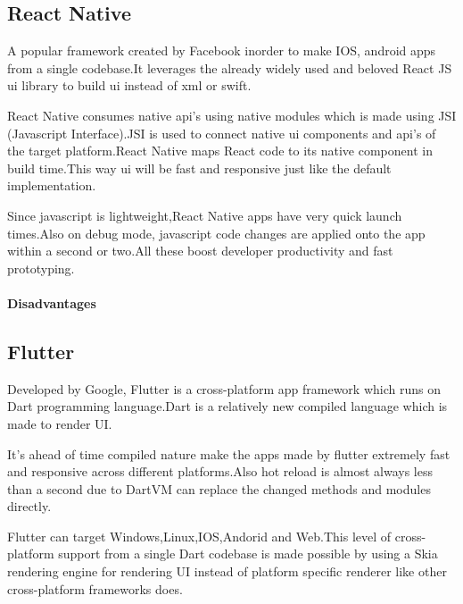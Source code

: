 \documentclass[14pt]{extarticle}
\begin{document}
\subsection{React Native}
\parbox{\linewidth}{
    A popular framework created by Facebook inorder to make IOS, android apps from a single codebase.It leverages the already widely used and beloved React JS ui library to build ui instead of xml or swift.

    React Native consumes native api's using native modules which is made using JSI (Javascript Interface).JSI is used to connect native ui components and api's of the target platform.React Native maps React code to its native component in build time.This way ui will be fast and responsive just like the default implementation.

    Since javascript is lightweight,React Native apps have very quick launch times.Also on debug mode, javascript code changes are applied onto the app
    within a second or two.All these boost developer productivity and fast prototyping.
}

\paragraph{Disadvantages}

\newpage
\subsection{Flutter}
\parbox{\linewidth}{
    Developed by Google, Flutter is a cross-platform app framework which runs on Dart programming language.Dart is a relatively new compiled language which is made to render UI.

    It's ahead of time compiled nature make the apps made by flutter extremely fast and responsive across different platforms.Also hot reload is almost always less than a second due to DartVM can replace the changed methods and modules directly.

    Flutter can target Windows,Linux,IOS,Andorid and Web.This level of cross-platform support from a single Dart codebase is made possible by using a Skia rendering engine for rendering UI instead of platform specific renderer like other cross-platform frameworks does.
}
\end{document}

